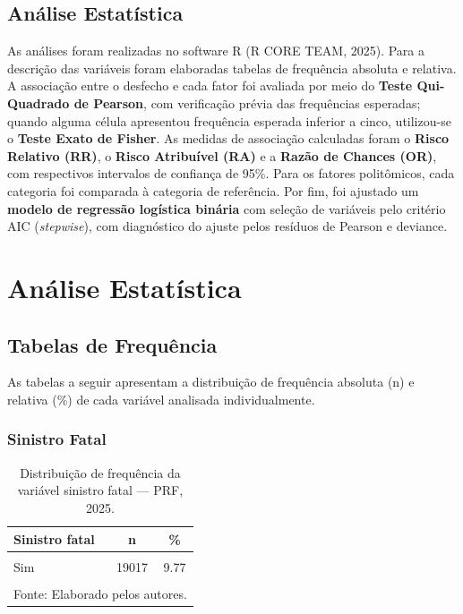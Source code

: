 \documentclass[
  brazilian,
  12pt,
]{article}
\begin{document}
\subsection{Análise Estatística}\label{anuxe1lise-estatuxedstica}

As análises foram realizadas no software R (R CORE TEAM, 2025). Para a
descrição das variáveis foram elaboradas tabelas de frequência absoluta
e relativa. A associação entre o desfecho e cada fator foi avaliada por
meio do \textbf{Teste Qui-Quadrado de Pearson}, com verificação prévia
das frequências esperadas; quando alguma célula apresentou frequência
esperada inferior a cinco, utilizou-se o \textbf{Teste Exato de Fisher}.
As medidas de associação calculadas foram o \textbf{Risco Relativo
(RR)}, o \textbf{Risco Atribuível (RA)} e a \textbf{Razão de Chances
(OR)}, com respectivos intervalos de confiança de 95\%. Para os fatores
politômicos, cada categoria foi comparada à categoria de referência. Por
fim, foi ajustado um \textbf{modelo de regressão logística binária} com
seleção de variáveis pelo critério AIC (\emph{stepwise}), com
diagnóstico do ajuste pelos resíduos de Pearson e deviance.

\newpage

\section{Análise Estatística}\label{anuxe1lise-estatuxedstica-1}

\subsection{Tabelas de Frequência}\label{tabelas-de-frequuxeancia}

As tabelas a seguir apresentam a distribuição de frequência absoluta (n)
e relativa (\%) de cada variável analisada individualmente.

\subsubsection{Sinistro Fatal}\label{sinistro-fatal}

\begingroup\fontsize{11}{13}\selectfont

\begin{longtable}[t]{lcc}
\caption{\label{tab:tab1}Distribuição de frequência da variável sinistro fatal — PRF, 2025.}\\
\toprule
Sinistro fatal & n & \%\\
\midrule
\cellcolor{gray!10}{Não} & \cellcolor{gray!10}{175605} & \cellcolor{gray!10}{90.23}\\
Sim & 19017 & 9.77\\
\textbf{\cellcolor{gray!10}{Total}} & \textbf{\cellcolor{gray!10}{194622}} & \textbf{\cellcolor{gray!10}{100.00}}\\
\bottomrule
\multicolumn{3}{l}{\rule{0pt}{1em}Fonte: Elaborado pelos autores.}\\
\end{longtable}
\endgroup{}
\end{document}
